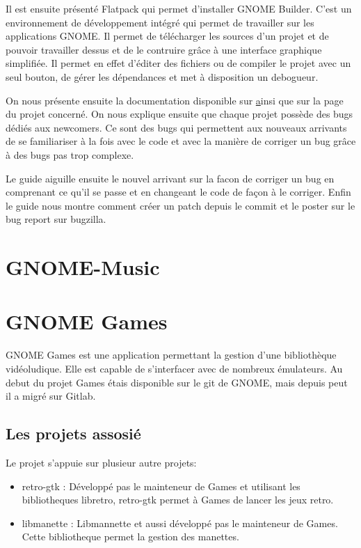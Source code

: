 \documentclass[12pt]{report}
\begin{document}
Il est ensuite présenté Flatpack qui permet d'installer GNOME Builder.
C'est un environnement de développement intégré qui permet de travailler
sur les applications GNOME. Il permet de télécharger les sources d'un
projet et de pouvoir travailler dessus et de le contruire grâce à une
interface graphique simplifiée. Il permet en effet d'éditer des fichiers
ou de compiler le projet avec un seul bouton, de gérer les dépendances
et met à disposition un debogueur.

On nous présente ensuite la documentation disponible sur
\href{https://developper.gnome.org/search} ainsi que sur la page du
projet concerné. On nous explique ensuite que chaque projet possède
des bugs dédiés aux newcomers. Ce sont des bugs qui permettent aux
nouveaux arrivants de se familiariser à la fois avec le code et
avec la manière de corriger un bug grâce à des bugs pas trop
complexe.

Le guide aiguille ensuite le nouvel arrivant sur la facon de corriger
un bug en comprenant ce qu'il se passe et en changeant le code de
façon à le corriger. Enfin le guide nous montre comment créer un
patch depuis le commit et le poster sur le bug report sur bugzilla.


\newpage
\chapter{GNOME-Music}

\newpage
\chapter{GNOME Games}
GNOME Games est une application permettant la gestion d'une
bibliothèque vidéoludique. Elle est capable de s'interfacer avec de
nombreux émulateurs.
Au debut du projet Games étais disponible sur le git de GNOME, mais 
depuis peut il a migré sur Gitlab.

\section{Les projets assosié}
Le projet s'appuie sur plusieur autre projets:
\begin{itemize}
\item retro-gtk : Développé pas le mainteneur de Games et utilisant les bibliotheques libretro,
retro-gtk permet à Games de lancer les jeux retro.
\item libmanette : Libmannette et aussi développé pas le mainteneur de Games. Cette bibliotheque
permet la gestion des manettes.
\end{itemize}
\end{document}

